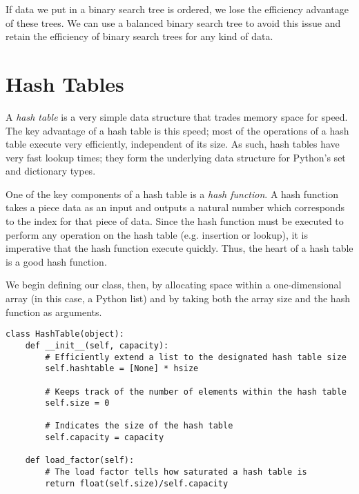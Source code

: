 If data we put in a binary search tree is ordered, we lose the efficiency advantage of these trees.
We can use a balanced binary search tree to avoid this issue and retain the efficiency of binary search trees for any kind of data.

\section*{Hash Tables}
A \emph{hash table} is a very simple data structure that trades memory space for speed.
The key advantage of a hash table is this speed; most of the operations of a hash table execute very efficiently, independent of its size.
As such, hash tables have very fast lookup times; they form the underlying data structure for Python's set and dictionary types.

One of the key components of a hash table is a \emph{hash function}.
A hash function takes a piece data as an input and outputs a natural number which corresponds to the index for that piece of data.
Since the hash function must be executed to perform any operation on the hash table (e.g. insertion or lookup), it is imperative that the hash function execute quickly.
Thus, the heart of a hash table is a good hash function.

We begin defining our  class, then, by allocating space within a one-dimensional array (in this case, a Python list) and by taking both the array size and the hash function as arguments.
\begin{lstlisting}
class HashTable(object):
    def __init__(self, capacity):
        # Efficiently extend a list to the designated hash table size
        self.hashtable = [None] * hsize
        
        # Keeps track of the number of elements within the hash table
        self.size = 0
        
        # Indicates the size of the hash table
        self.capacity = capacity
        
    def load_factor(self):
        # The load factor tells how saturated a hash table is
        return float(self.size)/self.capacity
\end{lstlisting}


